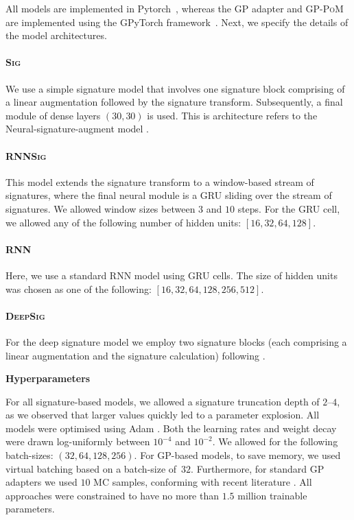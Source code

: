 \documentclass{article}
\renewcommand{\subsubsection}[1]{\textbf{#1}

} %
\begin{document}
All models are implemented in Pytorch~\citep{pytorch2019}, whereas the
GP adapter and \textsc{GP-PoM} are implemented using the GPyTorch
framework~\citep{gardner2018gpytorch}. Next, we specify the details of
the model architectures.

\paragraph{\textsc{Sig}}
We use a simple signature model that involves one        signature block comprising of a linear
    augmentation followed by the signature transform. Subsequently, a final module of dense layers $(30,30)$ is used. This is architecture refers to the Neural-signature-augment model \cite{kidger2019deep}.
  \paragraph{\textsc{RNNSig}} This model extends the signature transform to a window-based
    stream of signatures, where the final neural module is a GRU
    sliding over the stream of signatures. We allowed window sizes between $3$ and $10$ steps. For the GRU cell, we allowed any of the following number of hidden units: $[16,32,64,128]$.
    
  \paragraph{\textsc{RNN}} Here, we use a standard RNN model using GRU cells. The size of hidden units was chosen as one of the following: $[16,32,64,128, 256, 512]$.
  \paragraph{\textsc{DeepSig}} For the deep signature model we  employ two signature blocks (each comprising a linear augmentation and the signature calculation) following \citet{kidger2019deep}.

\subsubsection{Hyperparameters}

For all signature-based models, we allowed a signature truncation
depth of $2$--$4$, as we observed that larger values quickly led to
a parameter explosion. All models were optimised using Adam
\citep{kingma2014adam}. Both the learning rates and weight decay
were drawn log-uniformly between $10^{-4}$ and $10^{-2}$. We allowed
for the following batch-sizes: $(32, 64, 128, 256)$. For GP-based
models, to save memory, we used virtual batching based on
a batch-size of~$32$. Furthermore, for standard GP adapters we used $10$ MC samples, conforming with recent literature \citep{futoma2017mgp, moor2019early}. All approaches were constrained to have no more than $1.5$ million trainable parameters.
    
\end{document}
